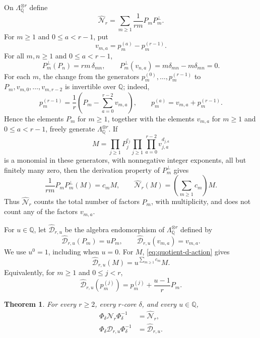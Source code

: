 \documentclass[12pt,reqno,a4paper]{amsart}
\numberwithin{equation}{section}
\numberwithin{figure}{section}
\theoremstyle{plain}
\newtheorem{theorem}{Theorem}[section]
\theoremstyle{definition}
\begin{document}
On $\Lambda_{\mathbb Q}^{\otimes r}$ define
\begin{equation}\label{eq:quotient-number-operator}
 \widehat{\mathcal N}_r
 =\sum_{m\geq1}\frac{1}{rm}P_mP_m^{\perp}.
\end{equation}
For $m\geq1$ and $0\leq a<r-1$, put
\[
 v_{m,a}=p_m^{(a)}-p_m^{(r-1)}.
\]
For all $m,n\geq1$ and $0\leq a<r-1$,
\[
 P_m^{\perp}(P_n)=rm\,\delta_{mn},
 \qquad
 P_m^{\perp}(v_{n,a})
 =m\delta_{mn}-m\delta_{mn}=0.
\]
For each $m$, the change from the generators
$p_m^{(0)},\ldots,p_m^{(r-1)}$ to
$P_m,v_{m,0},\ldots,v_{m,r-2}$ is invertible over $\mathbb Q$; indeed,
\[
 p_m^{(r-1)}
 =\frac1r\left(P_m-\sum_{a=0}^{r-2}v_{m,a}\right),
 \qquad
 p_m^{(a)}=v_{m,a}+p_m^{(r-1)}.
\]
Hence the elements $P_m$ for $m\geq1$, together with the elements
$v_{m,a}$ for $m\geq1$ and $0\leq a<r-1$, freely generate
$\Lambda_{\mathbb Q}^{\otimes r}$.  If
\[
 M=\prod_{j\geq1}P_j^{c_j}
   \prod_{j\geq1}\prod_{a=0}^{r-2}v_{j,a}^{d_{j,a}}
\]
is a monomial in these generators, with nonnegative integer exponents, all but finitely many zero, then the derivation property of $P_m^{\perp}$ gives
\[
 \frac{1}{rm}P_mP_m^{\perp}(M)=c_mM,
 \qquad
 \widehat{\mathcal N}_r(M)=\left(\sum_{m\geq1}c_m\right)M.
\]
Thus $\widehat{\mathcal N}_r$ counts the total number of factors
$P_m$, with multiplicity, and does not count any of the factors
$v_{m,a}$.

For $u\in\mathbb Q$, let $\widehat{\mathcal D}_{r,u}$ be the algebra
endomorphism of $\Lambda_{\mathbb Q}^{\otimes r}$ defined by
\begin{equation}\label{eq:quotient-d-action}
 \widehat{\mathcal D}_{r,u}(P_m)=uP_m,
 \qquad
 \widehat{\mathcal D}_{r,u}(v_{m,a})=v_{m,a}.
\end{equation}
We use $u^0=1$, including when $u=0$.
For $M$, \eqref{eq:quotient-d-action} gives
\[
 \widehat{\mathcal D}_{r,u}(M)
 =u^{\sum_{m\geq1}c_m}M.
\]
Equivalently, for $m\geq1$ and $0\leq j<r$,
\begin{equation}\label{eq:quotient-d-generators}
 \widehat{\mathcal D}_{r,u}(p_m^{(j)})
 =p_m^{(j)}+\frac{u-1}{r}P_m.
\end{equation}

\begin{theorem}
\label{thm:d-under-phi}
For every $r\geq2$, every $r$-core $\delta$, and every
$u\in\mathbb Q$,
\begin{align}
 \Phi_\delta\mathcal N_r\Phi_\delta^{-1}
 &=\widehat{\mathcal N}_r,
 \label{eq:n-under-phi}\\
 \Phi_\delta\mathcal D_{r,u}\Phi_\delta^{-1}
 &=\widehat{\mathcal D}_{r,u}.
 \label{eq:d-under-phi}
\end{align}
\end{theorem}
\end{document}
